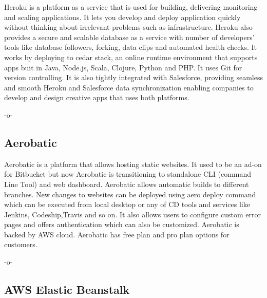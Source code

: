 Heroku is a platform as a service that is used for building,
delivering monitoring and scaling applications\cite{www-Heroku}. It
lets you develop and deploy application quickly without thinking about
irrelevant problems such as infrastructure. Heroku also provides a
secure and scalable database as a service with number of developers'
tools like database followers, forking, data clips and automated
health checks. It works by deploying to cedar stack, an online runtime
environment that supports apps buit in Java, Node.js, Scala, Clojure,
Python and PHP\cite{www-cedar}. It uses Git for version
controlling. It is also tightly integrated with Salesforce, providing
seamless and smooth Heroku and Salesforce data synchronization
enabling companies to develop and design creative apps that uses both
platforms.

   -o-

\subsection{Aerobatic}

Aerobatic is a platform that allows hosting static
websites\cite{www-aero}. It used to be an ad-on for Bitbucket but now
Aerobatic is transitioning to standalone CLI (command Line Tool) and
web dashboard. Aerobatic allows automatic builds to different
branches. New changes to websites can be deployed using aero deploy
command which can be executed from local desktop or any of CD tools
and services like Jenkins, Codeship,Travis and so on.  It also allows
users to configure custom error pages and offers authentication which
can also be customized. Aerobatic is backed by AWS cloud. Aerobatic
has free plan and pro plan options for customers.

    -o-

\subsection{AWS Elastic Beanstalk}


